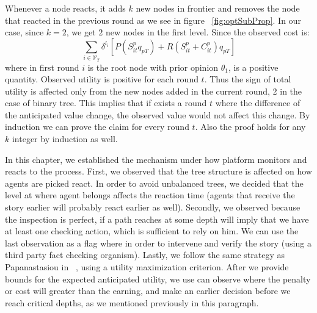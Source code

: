 Whenever a node reacts, it adds $k$ new nodes in frontier and removes the node that reacted in the previous round as we see in figure ~\ref{fig:optSubProp}. In our case, since $k=2$, we get $2$ new nodes in the first level. Since the observed cost is: 
$$\sum_{i \in \mathcal{V}_{T}}  \delta^{l_i} \left[ P ( S_{it}^p q_{pT} ) + R ( S_{it}^p+C_{it}^p)q_{pT}  \right]$$
where in first round $i$ is the root node with prior opinion $\theta_1$, is a positive quantity. Observed utility is positive for each round $t$. Thus the sign of total utility is affected only from the new nodes added in the current round, 2 in the case of binary tree. This implies that if exists a round $t$ where the difference of the anticipated value change, the observed value would not affect this change. By induction we can prove the claim for every round $t$. Also the proof holds for any $k$ integer by induction as well.

	 
In this chapter, we established the mechanism under how platform monitors and reacts to the process. First, we observed that the tree structure is affected on how agents are picked react. In order to avoid unbalanced trees, we decided that the level at where agent belongs affects the reaction time (agents that receive the story earlier will probably react earlier as well). Secondly, we observed because the inspection is perfect, if a path reaches at some depth will imply that we have at least one checking action, which is sufficient to rely on him. We can use the last observation as a flag where in order to intervene and verify the story (using a third party fact checking organism). Lastly, we follow the same strategy as Papanastasiou in ~\cite{papanastasiou}, using a utility maximization criterion. After we provide bounds for the expected anticipated utility, we use can observe where the penalty or cost will greater than the earning, and make an earlier decision before we reach critical depths, as we mentioned previously in this paragraph.

